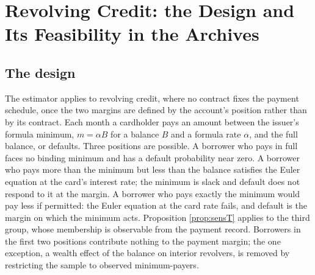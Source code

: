 \section{Revolving Credit: the Design and Its Feasibility in the Archives}\label{appendix:cards}

\subsection{The design}\label{sec:cards}

The estimator applies to revolving credit, where no contract fixes the payment schedule, once the two margins are defined by the account's position rather than by its contract. Each month a cardholder pays an amount between the issuer's formula minimum, $m = \alpha B$ for a balance $B$ and a formula rate $\alpha$, and the full balance, or defaults. Three positions are possible. A borrower who pays in full faces no binding minimum and has a default probability near zero. A borrower who pays more than the minimum but less than the balance satisfies the Euler equation at the card's interest rate; the minimum is slack and default does not respond to it at the margin. A borrower who pays exactly the minimum would pay less if permitted: the Euler equation at the card rate fails, and default is the margin on which the minimum acts. Proposition \ref{prop:sensT} applies to the third group, whose membership is observable from the payment record. Borrowers in the first two positions contribute nothing to the payment margin; the one exception, a wealth effect of the balance on interior revolvers, is removed by restricting the sample to observed minimum-payers.

